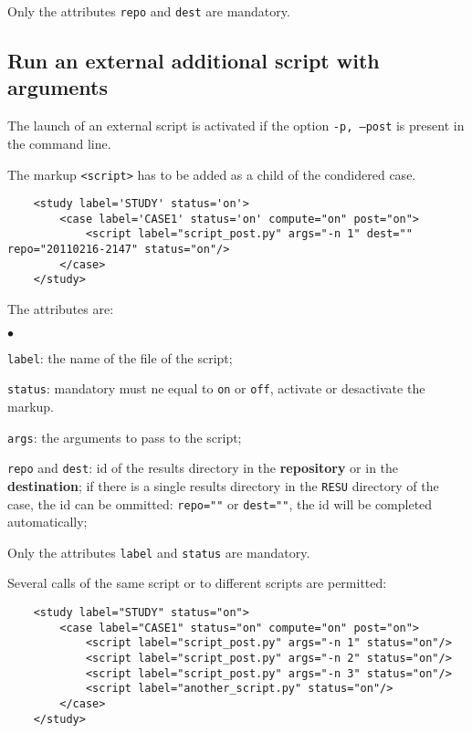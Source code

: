 \documentclass[a4paper,10pt,twoside]{article}
\begin{document}
Only the attributes \texttt{repo} and \texttt{dest} are mandatory.

\subsection{Run an external additional script with arguments}

The launch of an external script is activated if the option \texttt{-p, --post} is present in the command line.

The markup \texttt{<script>} has to be added as a child of the condidered case.

\begin{verbatim}
    <study label='STUDY' status='on'>
        <case label='CASE1' status='on' compute="on" post="on">
            <script label="script_post.py" args="-n 1" dest="" repo="20110216-2147" status="on"/>
        </case>
    </study>
\end{verbatim}

The attributes are:

\begin{list}{$\bullet$}{}
\item \texttt{label}: the name of the file of the script;
\item \texttt{status}: mandatory must ne equal to \texttt{on} or \texttt{off},
activate or desactivate the markup.
\item \texttt{args}: the arguments to pass to the script;
\item \texttt{repo} and \texttt{dest}: id of the results directory in the \textbf{repository} or
in the \textbf{destination}; if there is a single results directory in the \texttt{RESU} directory
of the case, the id can be ommitted: \texttt{repo=""} or \texttt{dest=""}, the id will be completed automatically;

\end{list}

Only the attributes \texttt{label} and \texttt{status} are mandatory.

Several calls of the same script or to different scripts are permitted:

\begin{verbatim}
    <study label="STUDY" status="on">
        <case label="CASE1" status="on" compute="on" post="on">
            <script label="script_post.py" args="-n 1" status="on"/>
            <script label="script_post.py" args="-n 2" status="on"/>
            <script label="script_post.py" args="-n 3" status="on"/>
            <script label="another_script.py" status="on"/>
        </case>
    </study>
\end{verbatim}
\end{document}
